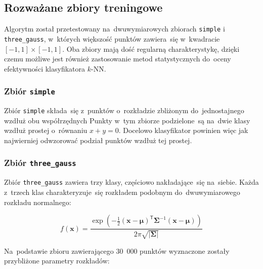 \documentclass[11pt,a4paper]{article}
\begin{document}
\subsection{Rozważane zbiory treningowe}

Algorytm został przetestowany na~dwuwymiarowych zbiorach {\tt simple} i {\tt three\_gauss}, w~których większość punktów zawiera~się w~kwadracie $[-1,1] \times [-1,1]$.
Oba zbiory mają dość regularną charakterystykę, dzięki czemu możliwe jest również zastosowanie metod statystycznych do~oceny efektywności klasyfikatora $k$-NN.

\subsubsection{Zbiór {\tt simple}}

Zbiór {\tt simple} składa~się z~punktów o~rozkładzie zbliżonym do~jednostajnego wzdłuż obu współrzędnych
Punkty w~tym zbiorze podzielone~są na~dwie klasy wzdłuż prostej o~równaniu $x + y = 0$.
Docelowo klasyfikator powinien więc jak najwierniej odwzorować podział punktów wzdłuż tej prostej.

\subsubsection{Zbiór {\tt three\_gauss}}

Zbiór {\tt three\_gauss} zawiera trzy klasy, częściowo nakładające~się na~siebie.
Każda z~trzech klas charakteryzuje~się rozkładem podobnym do~dwuwymiarowego rozkładu normalnego:

$$ f(\mathbf{x}) = \frac{\exp \left( -\frac{1}{2} (\mathbf{x} - \boldsymbol\mu)^\mathsf{T} \boldsymbol\Sigma^{-1} (\mathbf{x} - \boldsymbol\mu) \right)}{2\pi \sqrt{|\boldsymbol\Sigma|}} $$

Na~podstawie zbioru zawierającego 30~000 punktów wyznaczone zostały przybliżone parametry rozkładów:
\end{document}
